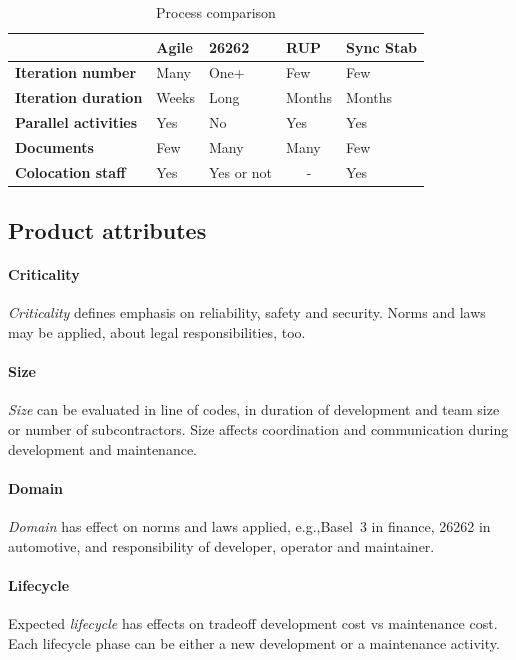 \begin{table}
\centering
\begin{tabular}{|l|l|l|l|l|}
\hline
& \textbf{Agile} & \textbf{26262} & \textbf{RUP} & \textbf{Sync Stab} \\
\hline
\textbf{Iteration number} & Many & One+ & Few & Few \\
\hline
\textbf{Iteration duration} & Weeks & Long & Months & Months \\
\hline
\textbf{Parallel activities} & Yes & No & Yes & Yes \\
\hline
\textbf{Documents} & Few & Many & Many & Few \\
\hline
\textbf{Colocation staff} & Yes & Yes or not & \multicolumn{1}{c|}{-} & Yes \\
\hline
\end{tabular}
\caption{Process comparison}
\end{table}

\subsection{Product attributes}
\paragraph{Criticality}
\emph{Criticality} defines emphasis on reliability, safety and security. Norms and laws may be applied, about legal responsibilities, too.

\paragraph{Size}
\emph{Size} can be evaluated in line of codes, in duration of development and team size or number of subcontractors. Size affects coordination and communication during development and maintenance.

\paragraph{Domain}
\emph{Domain} has effect on norms and laws applied, e.g.,\@ Basel~3 in finance, 26262 in automotive, and responsibility of developer, operator and maintainer.

\paragraph{Lifecycle}
Expected \emph{lifecycle} has effects on tradeoff development cost vs maintenance cost. Each lifecycle phase can be either a new development or a maintenance activity.

